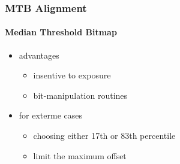 \documentclass[
	11pt, %
	aspectratio=169, %
]{beamer}
\begin{document}

\begin{frame}
	\frametitle{MTB Alignment}
	\framesubtitle{Median Threshold Bitmap}

	\begin{itemize}
		\item advantages
		\begin{itemize}
			\item insentive to exposure
			\item bit-manipulation routines
		\end{itemize}
		\item for exterme cases
		\begin{itemize}
			\item choosing either 17th or 83th percentile
			\item limit the maximum offset
		\end{itemize}
	\end{itemize}
\end{frame}
\end{document}
